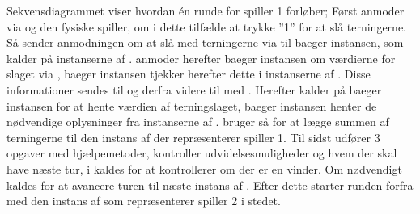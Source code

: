 Sekvensdiagrammet viser hvordan én runde for spiller 1 forløber; Først anmoder  via  og  den fysiske spiller, om i dette tilfælde at trykke ”1” for at slå terningerne. Så sender  anmodningen om at slå med terningerne via  til baeger instansen, som kalder  på instanserne af .  anmoder herefter baeger instansen om værdierne for slaget via , baeger instansen tjekker herefter dette i instanserne af . Disse informationer sendes til  og derfra videre til  med . Herefter kalder   på baeger instansen for at hente værdien af terningslaget, baeger instansen henter de nødvendige oplysninger fra instanserne af .  bruger så  for at lægge summen af terningerne til den instans af  der repræsenterer spiller 1. Til sidst udfører  3 opgaver med hjælpemetoder,  kontroller udvidelsesmuligheder og hvem der skal have næste tur, i  kaldes  for at kontrollerer om der er en vinder. Om nødvendigt kaldes  for at avancere turen til næste instans af . Efter dette starter runden forfra med den instans af  som repræsenterer spiller 2 i stedet.
